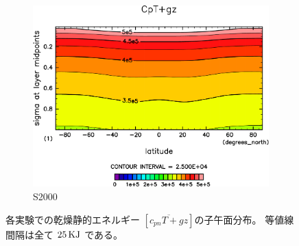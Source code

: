 \documentclass[body]{subfiles}
\begin{document}
\begin{figure}[t]
\begin{subfigure}{.4\textwidth}
		\includegraphics[width=\columnwidth]{S2000/CpT+gz,time=7300:7665-crop-rotate.pdf}
		\caption{S2000}\label{CpT+gzS2000}
	\end{subfigure}
	\caption[各実験での乾燥静的エネルギーの子午面分布]{
		各実験での乾燥静的エネルギー \([\overline{c_{pn}T+gz}]\)の子午面分布。
		等値線間隔は全て \(25\hmu{KJ}\) である。
	}\label{Cp+gz}
\end{figure}
\end{document}
